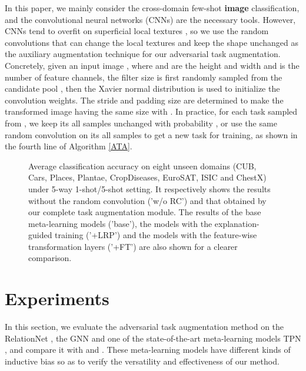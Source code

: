 \documentclass{article}
\begin{document}
In this paper, we mainly consider the cross-domain few-shot \textbf{image} classification, and the convolutional neural networks (CNNs) are the necessary tools. However, CNNs tend to overfit on superficial local textures \cite{DBLP:conf/iclr/GeirhosRMBWB19}, so we use the random convolutions \cite{DBLP:conf/iclr/LeeLSL20} that can change the local textures and keep the shape unchanged as the auxiliary augmentation technique for our adversarial task augmentation. Concretely, given an input image , where  and  are the height and width and  is the number of feature channels, the filter size  is first randomly sampled from the candidate pool , then the Xavier normal distribution \cite{glorot2010understanding} is used to initialize the convolution weights. The stride and padding size are determined to make the transformed image having the same size with . In practice, for each task  sampled from , we keep its all samples unchanged with probability , or use the same random convolution on its all samples to get a new task for training, as shown in the fourth line of Algorithm \ref{ATA}.

\begin{figure}
    \centering
    \caption{Average classification accuracy on eight unseen domains (CUB, Cars, Places, Plantae, CropDiseases, EuroSAT, ISIC and ChestX) under 5-way 1-shot/5-shot setting. It respectively shows the results without the random convolution ('w/o RC') and that obtained by our complete task augmentation module. The results of the base meta-learning models ('base'), the models with the explanation-guided training ('+LRP') and the models with the feature-wise transformation layers ('+FT') are also shown for a clearer comparison.}
    \label{fig2}
\end{figure}

\section{Experiments}
In this section, we evaluate the adversarial task augmentation method on the RelationNet \cite{sung2018learning}, the GNN \cite{garcia2018few} and one of the state-of-the-art meta-learning models TPN \cite{liu2019learning}, and compare it with \cite{DBLP:conf/iclr/TsengLH020} and \cite{sun2020explanation}. These meta-learning models have different kinds of inductive bias so as to verify the versatility and effectiveness of our method.
\end{document}
